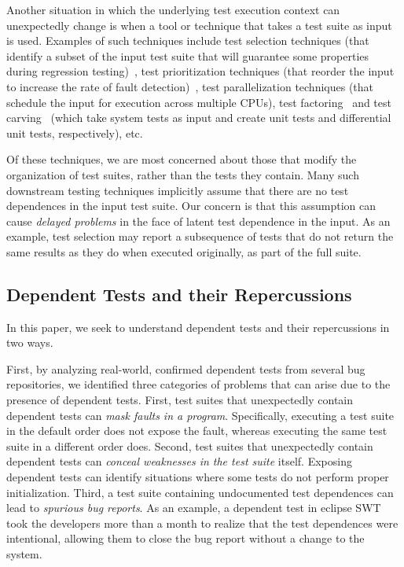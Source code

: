 Another situation in which the underlying test execution context can
unexpectedly change is when a tool or technique that takes a test
suite as input is used.  Examples of such techniques include
test selection techniques (that identify a subset of
the input test suite that will guarantee some properties during
regression testing)~\cite{harroldetal:OOPSLA:2001}, test prioritization techniques (that reorder the
input to increase the rate of fault detection)~\cite{Elbaum:2000:PTC:347324.348910}, test parallelization
techniques (that schedule the input for execution across multiple
CPUs), test factoring~\cite{Saff:2005} and test carving~\cite{Elbaum:2006} (which take system tests as
input and create unit tests and differential unit tests,
respectively), etc. 

Of these techniques, we are most concerned about
those that modify the organization of test suites, rather than the tests
they contain.
Many such downstream testing techniques implicitly assume that
there are no test dependences in the input test suite.  Our concern is
that this assumption can cause \emph{delayed problems} in the face
of latent test dependence in the input.  As an
example, test selection may report a subsequence of tests that do not
return the same results as they do when executed originally, as part of the full suite.

\subsection{Dependent Tests and their Repercussions}


In this paper, we seek to understand dependent tests and their repercussions
in two ways. 

First, by analyzing  real-world, confirmed dependent
tests from several bug repositories, we identified three
categories of problems that can arise due to the presence of dependent tests.
First, test suites that unexpectedly contain dependent tests can
\emph{mask faults in a program}. Specifically, executing a test suite in the
default order does not expose the fault, whereas
executing the same test suite in a different order does.
Second, test suites that unexpectedly contain dependent tests can \emph{conceal
weaknesses in the test suite} itself. Exposing
dependent tests can identify situations where some tests do not perform
proper initialization.
Third, a test suite containing undocumented test dependences can lead
to \emph{spurious bug reports}. As an example, a dependent test in
eclipse SWT took the developers
more than a month to realize that the test dependences were intentional,
allowing them to close the bug report without a change to the system.


